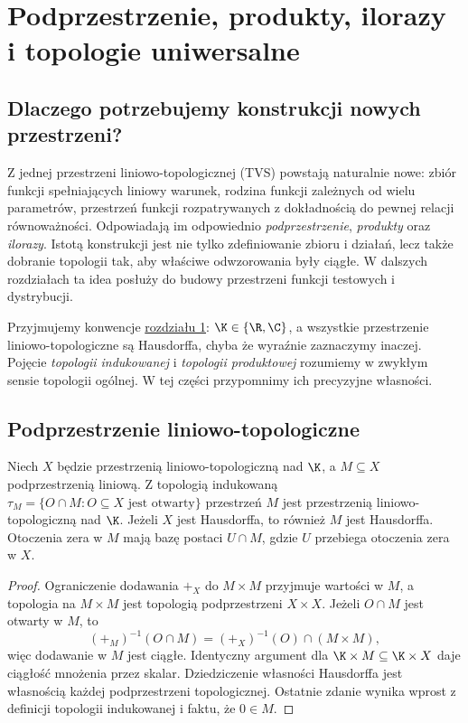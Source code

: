 \bigskip
\setcounter{section}{1}
\section{Podprzestrzenie, produkty, ilorazy i topologie uniwersalne}\label{sec:konstrukcje}

\providecommand{\atlasref}[2]{#2}


\subsection{Dlaczego potrzebujemy konstrukcji nowych przestrzeni?}

Z jednej przestrzeni liniowo-topologicznej (TVS) powstają naturalnie nowe:
zbiór funkcji spełniających liniowy warunek, rodzina funkcji zależnych
od wielu parametrów, przestrzeń funkcji rozpatrywanych z dokładnością
do pewnej relacji równoważności. Odpowiadają im odpowiednio
\emph{podprzestrzenie}, \emph{produkty} oraz \emph{ilorazy}.
Istotą konstrukcji jest nie tylko zdefiniowanie zbioru i działań,
lecz także dobranie topologii tak, aby właściwe odwzorowania były
ciągłe. W dalszych rozdziałach ta idea posłuży do budowy
przestrzeni funkcji testowych i dystrybucji.

Przyjmujemy konwencje \hyperref[sec:tvs]{rozdziału 1}: $\K\in\{\R,\C\}$,
a wszystkie przestrzenie liniowo-topologiczne są Hausdorffa,
chyba że wyraźnie zaznaczymy inaczej. Pojęcie \emph{topologii
indukowanej} i \emph{topologii produktowej} rozumiemy w zwykłym sensie
topologii ogólnej. W tej części przypomnimy ich precyzyjne własności.

\subsection{Podprzestrzenie liniowo-topologiczne}

\begin{twierdzenie}\label{thm:subspace-tvs}
Niech $X$ będzie przestrzenią liniowo-topologiczną nad $\K$,
a $M\subseteq X$ podprzestrzenią liniową. Z topologią indukowaną
$\tau_M=\{O\cap M:O\subseteq X\text{ jest otwarty}\}$
przestrzeń $M$ jest przestrzenią liniowo-topologiczną nad $\K$.
Jeżeli $X$ jest Hausdorffa, to również $M$ jest Hausdorffa.
Otoczenia zera w $M$ mają bazę postaci $U\cap M$, gdzie
$U$ przebiega otoczenia zera w $X$.
\end{twierdzenie}
\begin{proof}
Ograniczenie dodawania $+_X$ do $M\times M$ przyjmuje wartości
w $M$, a topologia na $M\times M$ jest topologią podprzestrzeni
$X\times X$. Jeżeli $O\cap M$ jest otwarty w $M$, to
\[
 (+_M)^{-1}(O\cap M)=(+_X)^{-1}(O)\cap(M\times M),
\]
więc dodawanie w $M$ jest ciągłe. Identyczny argument dla
$\K\times M\subseteq\K\times X$ daje ciągłość mnożenia
przez skalar. Dziedziczenie własności Hausdorffa jest własnością
każdej podprzestrzeni topologicznej. Ostatnie zdanie wynika
wprost z definicji topologii indukowanej i faktu, że $0\in M$.
\end{proof}

